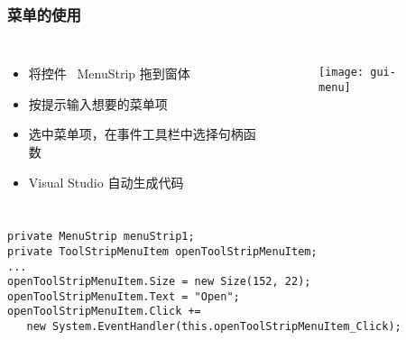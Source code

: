 \begin{frame}[fragile]
\frametitle{菜单的使用}
\begin{columns}
  \begin{itemize}
  \item 将控件 ~MenuStrip 拖到窗体
  \item 按提示输入想要的菜单项
  \item 选中菜单项，在事件工具栏中选择句柄函数
  \item Visual Studio 自动生成代码
  \end{itemize}
  \begin{figure}[htbp]
    \centering
    \texttt{[image: gui-menu]}
  \end{figure}
\end{columns}
\begin{lstlisting}
private MenuStrip menuStrip1;
private ToolStripMenuItem openToolStripMenuItem;
...
openToolStripMenuItem.Size = new Size(152, 22);
openToolStripMenuItem.Text = "Open";
openToolStripMenuItem.Click += 
   new System.EventHandler(this.openToolStripMenuItem_Click);
\end{lstlisting}
\end{frame}



